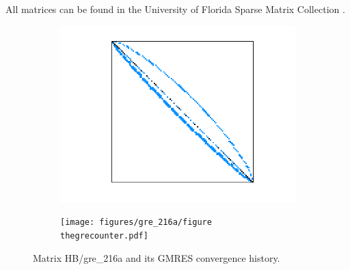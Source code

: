 \documentclass[twoside]{article}
\newcounter{fig}\setcounter{fig}{0}
\begin{document}
All matrices can be found in the University of Florida Sparse Matrix Collection \cite{Davis:2011:UFS:2049662.2049663}.
\begin{figure}[H]
  \centering
  \begin{subfigure}[t]{0.45\linewidth}
    \centering
    \includegraphics[width=1.1\linewidth]{figures/gre_216a/matrix.png}
    \caption{}		
  \end{subfigure}
  \quad
  \begin{subfigure}[t]{0.45\linewidth}
    \centering
    \texttt{[image: figures/gre\_216a/figure\\thegrecounter.pdf]}
    \caption{}
  \end{subfigure}
  \caption{Matrix HB/gre_216a and its GMRES convergence history.}\label{fig:gre_216a}
\end{figure}
\end{document}
